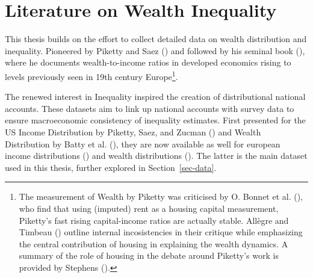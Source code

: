 \documentclass[
  a4paper,
  DIV=11,
  numbers=noendperiod]{scrartcl}
\begin{document}
\section{Literature on Wealth Inequality}\label{sec-literature}

This thesis builds on the effort to collect detailed data on wealth
distribution and inequality. Pioneered by Piketty and Saez
() and followed by
his seminal book
(),
where he documents wealth-to-income ratios in developed economics rising
to levels previously seen in 19th century Europe\footnote{The
  measurement of Wealth by Piketty was criticised by O. Bonnet et al.
  (), who find that
  using (imputed) rent as a housing capital measurement, Piketty's fast
  rising capital-income ratios are actually stable. Allègre and Timbeau
  () outline internal
  incosistencies in their critique while emphasizing the central
  contribution of housing in explaining the wealth dynamics. A summary
  of the role of housing in the debate around Piketty's work is provided
  by Stephens
  ().}.

The renewed interest in Inequality inspired the creation of
distributional national accounts. These datasets aim to link up national
accounts with survey data to ensure macroeconomic consistency of
inequality estimates. First presented for the US Income Distribution by
Piketty, Saez, and Zucman
() and
Wealth Distribution by Batty et al.
(), they
are now available as well for european income distributions
() and wealth distributions
(). The latter is the main dataset used in this thesis, further
explored in Section~\ref{sec-data}.
\end{document}
